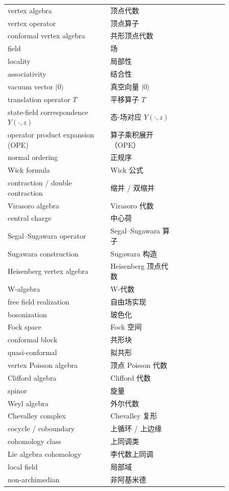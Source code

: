 \begin{longtable}{p{0.40\linewidth}p{0.28\linewidth}p{0.18\linewidth}}
vertex algebra & 顶点代数 &  \\
vertex operator & 顶点算子 &  \\
conformal vertex algebra & 共形顶点代数 &  \\
field & 场 &  \\
locality & 局部性 &  \\
associativity & 结合性 &  \\
vacuum vector $|0\rangle$ & 真空向量 $|0\rangle$ &  \\
translation operator $T$ & 平移算子 $T$ &  \\
state-field correspondence $Y(\cdot,z)$ & 态-场对应 $Y(\cdot,z)$ &  \\
operator product expansion (OPE) & 算子乘积展开（OPE） &  \\
normal ordering & 正规序 &  \\
Wick formula & Wick 公式 &  \\
contraction / double contraction & 缩并 / 双缩并 &  \\
Virasoro algebra & Virasoro 代数 &  \\
central charge & 中心荷 &  \\
Segal–Sugawara operator & Segal–Sugawara 算子 &  \\
Sugawara construction & Sugawara 构造 &  \\
Heisenberg vertex algebra & Heisenberg 顶点代数 &  \\
W-algebra & W-代数 &  \\
free field realization & 自由场实现 &  \\
bosonization & 玻色化 &  \\
Fock space & Fock 空间 &  \\
conformal block & 共形块 &  \\
quasi-conformal & 拟共形 &  \\
vertex Poisson algebra & 顶点 Poisson 代数 &  \\
Clifford algebra & Clifford 代数 &  \\
spinor & 旋量 &  \\
Weyl algebra & 外尔代数 &  \\
Chevalley complex & Chevalley 复形 &  \\
cocycle / coboundary & 上循环 / 上边缘 &  \\
cohomology class & 上同调类 &  \\
Lie algebra cohomology & 李代数上同调 &  \\
local field & 局部域 &  \\
non-archimedian & 非阿基米德 &  \\

\end{longtable}
